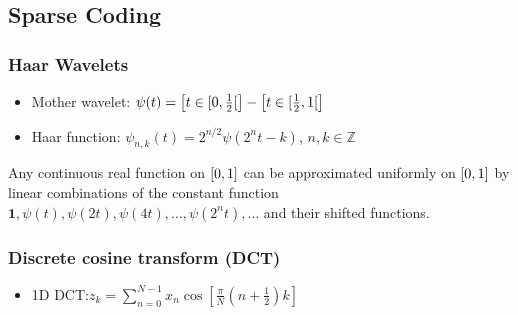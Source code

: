 \documentclass[11pt,a4paper,technote]{IEEEtran}
\newcommand{\iver}[1]{\left[#1\right]}
\newcommand{\norm}[1]{\left\lVert#1\right\rVert}
\newcommand{\vect}[1]{\boldsymbol{\mathbf{#1}}}
\newcommand*\diff{\mathop{}\!\mathrm{d}}
\newcommand{\R}{\mathbb{R}}
\newcommand{\Z}{\mathbb{Z}}
\begin{document}
\vspace{-1em}
\subsection*{Sparse Coding}
\subsubsection*{Haar Wavelets}
\begin{itemize}
  \item Mother wavelet: $\psi(t) = \iver{t\in\interval[open
      right]{0}{\frac{1}{2}}} - \iver{t\in\interval[open right]{\frac{1}{2}}{1}}$
    \item Haar function: $\psi_{n,k}(t) = 2^{n/2}\psi(2^{n}t-k)$, $n,k\in\Z$
\end{itemize}
Any continuous real function on $\interval{0}{1}$ can be approximated uniformly
on $\interval{0}{1}$ by linear combinations of the constant function $\vect{1},
\psi(t),\psi(2t),\psi(4t),\dotsc,\psi(2^n t),\dotsc$ and their shifted functions.

\subsubsection*{Discrete cosine transform (DCT)}
\begin{itemize}
  \item 1D DCT:\@ $z_k = \sum_{n=0}^{N-1}x_n\cos[\frac{\pi}{N}(n+\frac{1}{2})k]$
\end{itemize}
\end{document}
